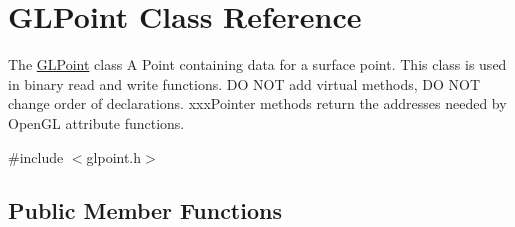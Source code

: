 \hypertarget{class_g_l_point}{}\section{G\+L\+Point Class Reference}
\label{class_g_l_point}


The \mbox{\hyperlink{class_g_l_point}{G\+L\+Point}} class A Point containing data for a surface point. This class is used in binary read and write functions. DO N\+OT add virtual methods, DO N\+OT change order of declarations. xxx\+Pointer methods return the addresses needed by Open\+GL attribute functions.  




{\ttfamily \#include $<$glpoint.\+h$>$}

\subsection*{Public Member Functions}
